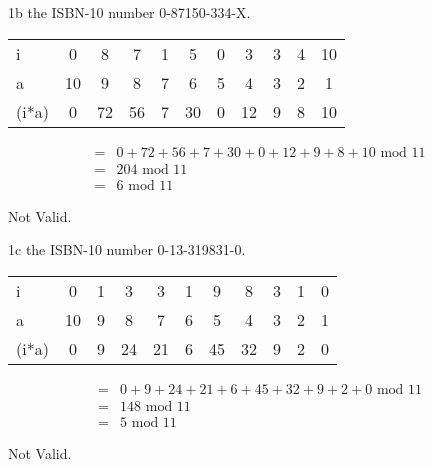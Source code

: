 \begin{question}{1b}
the ISBN-10 number 0-87150-334-X.

\begin{tabular}{l|cccccccccc}
\hline
i     & 0  & 8  & 7  & 1  & 5  & 0  & 3  & 3  & 4 & 10 \\
a     & 10 & 9  & 8  & 7  & 6  & 5  & 4  & 3  & 2 & 1 \\
\hline
(i*a) & 0  & 72 & 56 & 7  & 30 & 0  & 12 & 9  & 8 & 10
\end{tabular}

\begin{align*}
=&0  + 72 + 56 + 7  + 30 + 0  + 12 + 9  + 8 + 10\textrm{ mod } 11\\
=&204 \textrm{ mod } 11\\
=&6 \textrm{ mod } 11
\end{align*}

Not Valid.
\end{question}


\begin{question}{1c}
the ISBN-10 number 0-13-319831-0.

\begin{tabular}{l|cccccccccc}
\hline
i     & 0  & 1  & 3  & 3  & 1  & 9  & 8  & 3  & 1 & 0 \\
a     & 10 & 9  & 8  & 7  & 6  & 5  & 4  & 3  & 2 & 1 \\
\hline
(i*a) & 0  & 9  & 24 & 21 & 6  & 45 & 32 & 9  & 2 & 0
\end{tabular}

\begin{align*}
=& 0  + 9  + 24 + 21 + 6  + 45 + 32 + 9  + 2 + 0 \textrm{ mod } 11\\
=& 148 \textrm{ mod } 11\\
=& 5 \textrm{ mod } 11
\end{align*}

Not Valid.
\end{question}


